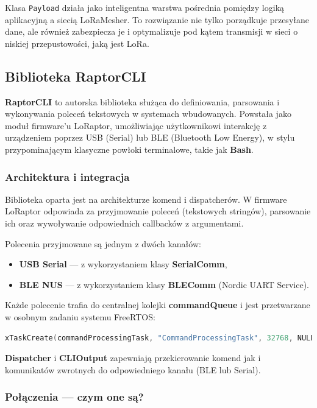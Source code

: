 Klasa \texttt{Payload} działa jako inteligentna warstwa pośrednia pomiędzy logiką aplikacyjną a siecią LoRaMesher. To rozwiązanie nie tylko porządkuje przesyłane dane, ale również zabezpiecza je i optymalizuje pod kątem transmisji w sieci o niskiej przepustowości, jaką jest LoRa.

\clearpage
\subsection{Biblioteka RaptorCLI}

\textbf{RaptorCLI} to autorska biblioteka służąca do definiowania, parsowania i wykonywania poleceń tekstowych w systemach wbudowanych. Powstała jako moduł firmware'u LoRaptor, umożliwiając użytkownikowi interakcję z urządzeniem poprzez USB (Serial) lub BLE (Bluetooth Low Energy), w stylu przypominającym klasyczne powłoki terminalowe, takie jak \textbf{Bash}.

\subsubsection{Architektura i integracja}

Biblioteka oparta jest na architekturze komend i dispatcherów. W firmware LoRaptor odpowiada za przyjmowanie poleceń (tekstowych stringów), parsowanie ich oraz wywoływanie odpowiednich callbacków z argumentami.

Polecenia przyjmowane są jednym z dwóch kanałów:
\begin{itemize}
	\item \textbf{USB Serial} --- z wykorzystaniem klasy \textbf{SerialComm},
	\item \textbf{BLE NUS} --- z wykorzystaniem klasy \textbf{BLEComm} (Nordic UART Service).
\end{itemize}

Każde polecenie trafia do centralnej kolejki \textbf{commandQueue} i jest przetwarzane w osobnym zadaniu systemu FreeRTOS:

\begin{lstlisting}[language=C++]
xTaskCreate(commandProcessingTask, "CommandProcessingTask", 32768, NULL, 1, NULL);
\end{lstlisting}

\textbf{Dispatcher} i \textbf{CLIOutput} zapewniają przekierowanie komend jak i komunikatów zwrotnych do odpowiedniego kanału (BLE lub Serial).

\clearpage
\subsubsection{Połączenia --- czym one są?}

